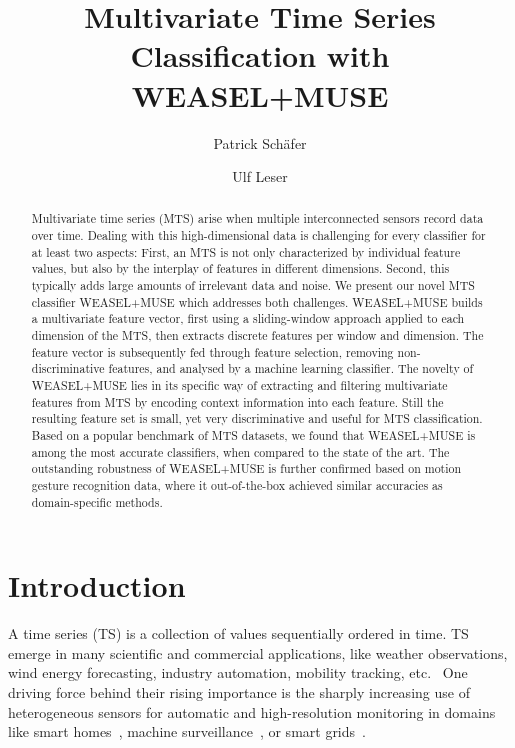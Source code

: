 \documentclass[sigconf]{acmart}
\begin{document}
\title{Multivariate Time Series Classification with WEASEL+MUSE}

\author{Patrick Sch\"afer}

\author{Ulf Leser}

\begin{abstract}
Multivariate time series (MTS) arise when multiple interconnected sensors record data over time. 
Dealing with this high-dimensional data is challenging for every classifier for at least two aspects: First, an MTS is not only characterized by individual feature values, but also by the interplay of features in different dimensions. Second, this typically adds large amounts of irrelevant data and noise.
We present our novel MTS classifier WEASEL+MUSE which addresses both challenges. WEASEL+MUSE builds a multivariate feature vector, first using a sliding-window approach applied to each dimension of the MTS, then extracts discrete features per window and dimension. The feature vector is subsequently fed through feature selection, removing non-discriminative features, and analysed by a machine learning classifier. The novelty of WEASEL+MUSE lies in its specific way of extracting and filtering multivariate features from MTS by encoding context information into each feature. Still the resulting feature set is small, yet very discriminative and useful for MTS classification.
Based on a popular benchmark of  MTS datasets, we found that WEASEL+MUSE is among the most accurate classifiers, when compared to the state of the art. The outstanding robustness of WEASEL+MUSE is further confirmed based on motion gesture recognition data, where it out-of-the-box achieved similar accuracies as domain-specific methods.
\end{abstract}

\maketitle
\sloppy

\section{Introduction}
A time series (TS) is a collection of values sequentially ordered in time. TS emerge in many scientific and commercial applications, like weather observations, wind energy forecasting, industry automation, mobility tracking, etc.~\cite{UCRClassification} One driving force behind their rising importance is the sharply increasing use of heterogeneous sensors for automatic and high-resolution monitoring in domains like smart homes~\cite{jerzak2014debs}, machine surveillance~\cite{mutschler2013debs}, or smart grids~\cite{WindPower,hobbs1999analysis}. 
\end{document}
